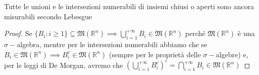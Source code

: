 \begin{cor}
	Tutte le unioni e le intersezioni numerabili di insiemi chiusi o aperti sono ancora misurabili secondo Lebesgue
\end{cor}
\begin{proof}
	Se $\{ B_i : i \geq 1 \} \subseteq \mathfrak{M}(\mathbb{R}^n) \implies \bigcup\limits_{i=1}^{+\infty} B_i \in \mathfrak{M}(\mathbb{R}^n)$ perché $\mathfrak{M}(\mathbb{R}^n)$ è una $\sigma-$algebra, mentre per le intersezioni numerabili abbiamo che se $B_i \in \mathfrak{M}(\mathbb{R}^n) \implies B_i^c \in \mathfrak{M}(\mathbb{R}^n)$ (sempre per le proprietà delle $\sigma-$algebre)
	e, per le leggi di De Morgan, avremo che $\left(\bigcup\limits_{i=1}^{+\infty} B_i^c \right)^c = \bigcap\limits_{i=1}^{+\infty} B_i \in \mathfrak{M}(\mathbb{R}^n)$
\end{proof}
